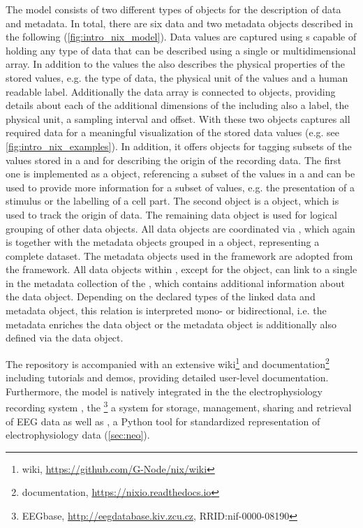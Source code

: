The  model consists of two different types of objects for the description of data and metadata. In total, there are six data and two metadata objects  described in the following (\ref{fig:intro_nix_model}).
Data values are captured using s capable of holding any type of data that can be described using a single or multidimensional array. In addition to the values the  also describes the physical properties of the stored values, e.g. the type of data, the physical unit of the values and a human readable label. Additionally the data array is connected to  objects, providing details about each of the additional dimensions of the  including also a label, the physical unit, a sampling interval and offset. With these two objects  captures all required data for a meaningful visualization of the stored data values (e.g. see \cref{fig:intro_nix_examples}). In addition, it offers objects for tagging subsets of the values stored in a  and for describing the origin of the recording data. The first one is implemented as a  object, referencing a subset of the values in a  and can be used to provide more information for a subset of values, e.g. the presentation of a stimulus or the labelling of a cell part. The second object is a  object, which is used to track the origin of data. The remaining data object  is used for logical grouping of other  data objects. All data objects are coordinated via , which again is together with the metadata objects grouped in a   object, representing a complete dataset.
The metadata objects used in the  framework are adopted from the  framework. All data objects within , except for the  object, can link to a single  in the metadata collection of the  , which contains additional information about the data object. Depending on the declared types of the linked data and metadata object, this relation is interpreted mono- or bidirectional, i.e. the metadata  enriches the data object or the metadata object is additionally also defined via the data object.

The  repository is accompanied with an extensive wiki\footnote{ wiki, \url{https://github.com/G-Node/nix/wiki}} and documentation\footnote{ documentation, \url{https://nixio.readthedocs.io}} including tutorials and demos, providing detailed user-level documentation. Furthermore, the  model is natively integrated in the the electrophysiology recording system , the \footnote{EEGbase, \url{http://eegdatabase.kiv.zcu.cz}, RRID:nif-0000-08190} a system for storage, management, sharing and retrieval of EEG data as well as , a Python tool for standardized representation of electrophysiology data (\ref{sec:neo}).


